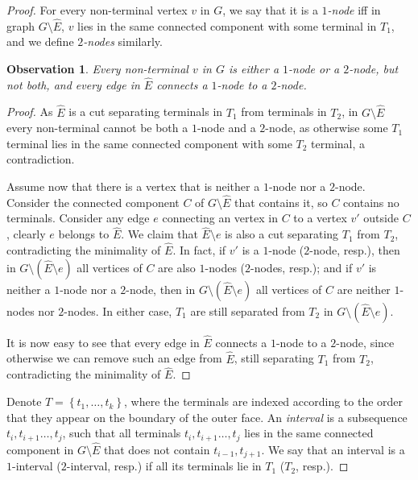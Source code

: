 \documentclass[11pt]{article}
\newtheorem{observation}[theorem]{Observation}
\theoremstyle{definition}
\newcommand{\set}[1]{\left\{ #1 \right\}}
\newcounter{note}
\begin{document}
\begin{proof}
	For every non-terminal vertex $v$ in $G$, we say that it is a \emph{$1$-node} iff in graph $G\setminus \hat E$, $v$ lies in the same connected component with some terminal in $T_1$, and we define \emph{$2$-nodes} similarly.
	
	\begin{observation}
		\label{obs: 1 vs 2}
		Every non-terminal $v$ in $G$ is either a $1$-node or a $2$-node, but not both, and every edge in $\hat E$ connects a $1$-node to a $2$-node.
	\end{observation}
	\begin{proof}
		As $\hat E$ is a cut separating terminals in $T_1$ from terminals in $T_2$, in $G\setminus \hat E$ every non-terminal cannot be both a $1$-node and a $2$-node, as otherwise some $T_1$ terminal lies in the same connected component with some $T_2$ terminal, a contradiction.
		
		Assume now that there is a vertex that is neither a $1$-node nor a $2$-node. Consider the connected component $C$ of $G\setminus\hat E$ that contains it, so $C$ contains no terminals. Consider any edge $e$ connecting an vertex in $C$ to a vertex $v'$ outside $C$, clearly $e$ belongs to $\hat E$.
		We claim that $\hat E\setminus e$ is also a cut separating $T_1$ from $T_2$, contradicting the minimality of $\hat E$.
In fact, if $v'$ is a $1$-node ($2$-node, resp.), then in $G\setminus (\hat E\setminus e)$ all vertices of $C$ are also $1$-nodes ($2$-nodes, resp.); and if $v'$ is neither a $1$-node nor a $2$-node, then in $G\setminus (\hat E\setminus e)$ all vertices of $C$ are neither $1$-nodes nor $2$-nodes. In either case, $T_1$ are still separated from $T_2$ in $G\setminus (\hat E\setminus e)$.
		
		It is now easy to see that every edge in $\hat E$ connects a $1$-node to a $2$-node, since otherwise we can remove such an edge from $\hat E$, still separating $T_1$ from $T_2$, contradicting the minimality of $\hat E$.
	\end{proof}


	Denote $T=\set{t_1,\ldots,t_k}$, where the terminals are indexed according to the order that they appear on the boundary of the outer face. An \emph{interval} is a subsequence $t_i,t_{i+1}\ldots,t_j$, such that all terminals $t_i,t_{i+1}\ldots,t_j$ lies in the same connected component in $G\setminus \hat E$ that does not contain $t_{i-1}, t_{j+1}$.
	We say that an interval is a $1$-interval ($2$-interval, resp.) if all its terminals lie in $T_1$ ($T_2$, resp.).
	

\end{proof}
\end{document}
